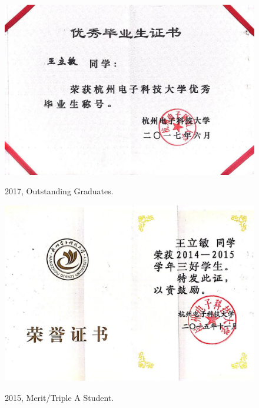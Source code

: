 \documentclass[11pt]{article}
\begin{document}
\begin{figure}[ht]
	\centering
	\includegraphics[width=14cm]{fig/cer2.jpg}\\
	\caption{2017, Outstanding Graduates.}
\end{figure}

\begin{figure}[ht]
	\centering
	\includegraphics[width=14cm]{fig/cer3.jpg}\\
	\caption{2015, Merit/Triple A Student.}
\end{figure}
\end{document}
